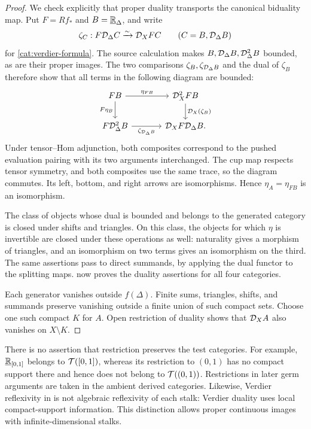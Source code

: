 \begin{proof}
We check explicitly that proper duality transports the canonical
biduality map.  Put $F=Rf_*$ and $B=\underline{\mathbb R}_{\Delta}$, and write
\[
 \zeta_C:F\mathcal D_\Delta C\xrightarrow{\sim}\mathcal D_XFC
 \qquad(C=B,\mathcal D_\Delta B)
\]
for \eqref{cat:verdier-formula}.  The source calculation makes
$B,\mathcal D_\Delta B,\mathcal D_\Delta^2B$ bounded, as are their proper images.
The two comparisons $\zeta_B,\zeta_{\mathcal D_\Delta B}$ and the dual of
$\zeta_B$ therefore show that all terms in the following diagram are
bounded:
\begin{equation}
 \label{cat:proper-biduality}
 \begin{tikzcd}[column sep=large]
 FB \arrow[r,"\eta_{FB}"] \arrow[d,"F\eta_B"'] &
 \D_X^2FB \arrow[d,"\D_X(\zeta_B)"] \\
 F\D_\Delta^2B \arrow[r,"\zeta_{\D_\Delta B}"'] &
 \D_XF\D_\Delta B.
 \end{tikzcd}
\end{equation}
Under tensor--Hom adjunction, both composites correspond to the
pushed evaluation pairing with its two arguments interchanged.  The
cup map respects tensor symmetry, and both composites use the same
trace, so the diagram commutes.  Its left, bottom, and right arrows
are isomorphisms.  Hence $\eta_A=\eta_{FB}$ is an isomorphism.

The class of objects whose dual is bounded and belongs to the generated
category is closed under shifts and triangles.  On this class, the
objects for which $\eta$ is invertible are closed under these operations
as well: naturality gives a morphism of triangles, and an isomorphism on
two terms gives an isomorphism on the third.  The same assertions pass
to direct summands, by applying the dual functor to the splitting maps.
 now proves the duality assertions for all
four categories.

Each generator vanishes outside $f(\Delta)$.  Finite sums, triangles,
shifts, and summands preserve vanishing outside a finite union of such
compact sets.  Choose one such compact $K$ for $A$.  Open restriction of
duality shows that $\mathcal D_X A$ also vanishes on $X\setminus K$.
\end{proof}

\begin{remark}
\label{cat:restriction-caution}
There is no assertion that restriction preserves the test categories.
For example, $\underline{\mathbb R}_{[0,1]}$ belongs to $\mathcal T([0,1])$, whereas its
restriction to $(0,1)$ has no compact support there and hence does not
belong to $\mathcal T((0,1))$.  Restrictions in later germ arguments are taken
in the ambient derived categories.  Likewise, Verdier reflexivity in
 is not algebraic reflexivity of each stalk:
Verdier duality uses local compact-support information.  This distinction
allows proper continuous images with infinite-dimensional stalks.
\end{remark}

